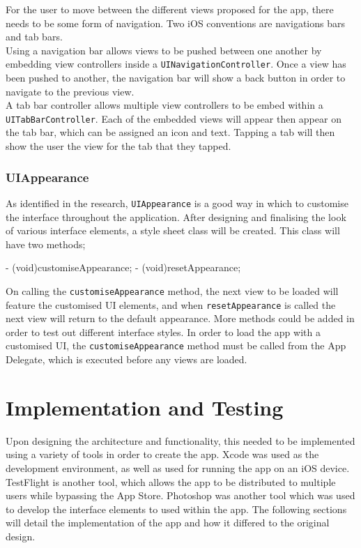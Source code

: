 \documentclass[12pt]{report}
\begin{document}
For the user to move between the different views proposed for the app, there needs to be some form of navigation. Two iOS conventions are navigations bars and tab bars.\\ 

Using a navigation bar allows views to be pushed between one another by embedding view controllers inside a \texttt{UINavigationController}. Once a view has been pushed to another, the navigation bar will show a back button in order to navigate to the previous view.\\

A tab bar controller allows multiple view controllers to be embed within a \texttt{UITabBarController}. Each of the embedded views will appear then appear on the tab bar, which can be assigned an icon and text. Tapping a tab will then show the user the view for the tab that they tapped.

\subsection{UIAppearance}

As identified in the research, \texttt{UIAppearance} is a good way in which to customise the interface throughout the application. After designing and finalising the look of various interface elements, a style sheet class will be created. This class will have two methods;

\begin{objccode}
- (void)customiseAppearance;
- (void)resetAppearance;
\end{objccode}

On calling the \texttt{customiseAppearance} method, the next view to be loaded will feature the customised UI elements, and when \texttt{resetAppearance} is called the next view will return to the default appearance. More methods could be added in order to test out different interface styles. In order to load the app with a customised UI, the \texttt{customiseAppearance} method must be called from the App Delegate, which is executed before any views are loaded.

\chapter{Implementation and Testing}

Upon designing the architecture and functionality, this needed to be implemented using a variety of tools in order to create the app. Xcode was used as the development environment, as well as used for running the app on an iOS device. TestFlight is another tool, which allows the app to be distributed to multiple users while bypassing the App Store. Photoshop was another tool which was used to develop the interface elements to used within the app. The following sections will detail the implementation of the app and how it differed to the original design.
\end{document}

